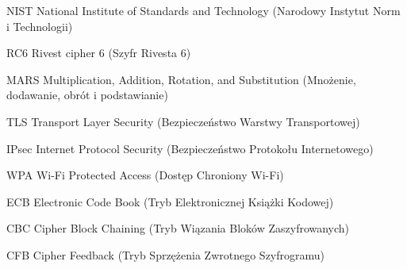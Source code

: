 \begin{abbrev}
\item[NIST] National Institute of Standards and Technology (Narodowy Instytut Norm i Technologii)
\item[RC6] Rivest cipher 6 (Szyfr Rivesta 6)
\item[MARS] Multiplication, Addition, Rotation, and Substitution  (Mnożenie, dodawanie, obrót i podstawianie)
\item[TLS] Transport Layer Security (Bezpieczeństwo Warstwy Transportowej)
\item[IPsec] Internet Protocol Security (Bezpieczeństwo Protokołu Internetowego)
\item[WPA] Wi-Fi Protected Access (Dostęp Chroniony Wi-Fi)
\item[ECB] Electronic Code Book (Tryb Elektronicznej Książki Kodowej)
\item[CBC] Cipher Block Chaining (Tryb Wiązania Bloków Zaszyfrowanych)
\item[CFB] Cipher Feedback (Tryb Sprzężenia Zwrotnego Szyfrogramu)
\end{abbrev}

